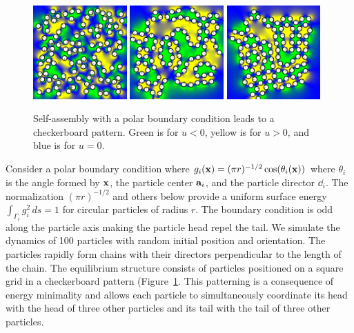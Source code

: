 \begin{figure}[h!]
  \begin{center}
    \includegraphics[width=0.32\textwidth]{figures/SpecificAim1/N100A1.pdf}
    \includegraphics[width=0.32\textwidth]{figures/SpecificAim1/N100A2.pdf}
    \includegraphics[width=0.32\textwidth]{figures/SpecificAim1/N100A3.pdf}
    \end{center}
  \caption{\label{fig:self-assemblyA} Self-assembly with a polar
  boundary condition leads to a checkerboard pattern. Green is for $u <
  0$, yellow is for $u > 0$, and blue is for $u = 0$.}
\end{figure}

Consider a polar boundary condition where $g_i(\xx) = (\pi r)^{-1/2}
\cos (\theta_i(\xx))$ where $\theta_i$ is the angle formed by $\xx$, the
particle center $\aa_i$, and the particle director $\dd_i$. The
normalization $(\pi r)^{-1/2}$ and others below provide a uniform
surface energy $\int_{\Gamma_i} g_i^2 \,ds = 1$ for circular particles
of radius $r$. The boundary condition is odd along the particle axis
making the particle head repel the tail. We simulate the dynamics of 100
particles with random initial position and orientation. The particles
rapidly form chains with their directors perpendicular to the length of
the chain. The equilibrium structure consists of particles positioned on
a square grid in a checkerboard pattern
(Figure~\ref{fig:self-assemblyA}. This patterning is a consequence of
energy minimality and allows each particle to simultaneously coordinate
its head with the head of three other particles and its tail with the
tail of three other particles. 

